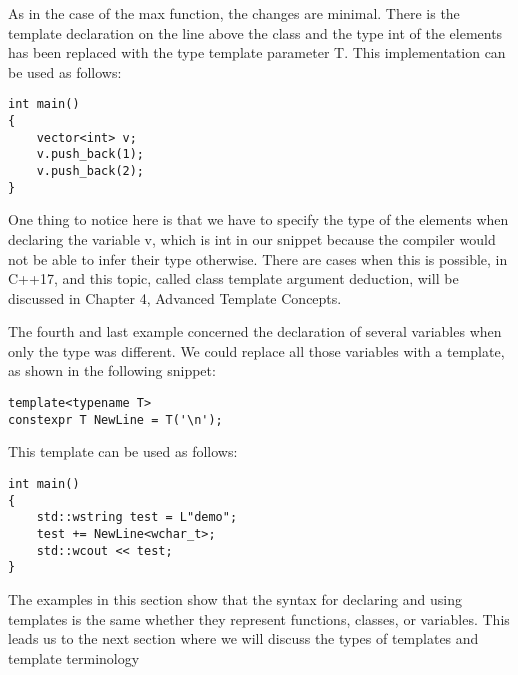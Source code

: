 As in the case of the max function, the changes are minimal. There is the template declaration on the line above the class and the type int of the elements has been replaced with the type template parameter T. This implementation can be used as follows:

\begin{lstlisting}[style=styleCXX]
int main()
{
	vector<int> v;
	v.push_back(1);
	v.push_back(2);
}
\end{lstlisting}

One thing to notice here is that we have to specify the type of the elements when declaring the variable v, which is int in our snippet because the compiler would not be able to infer their type otherwise. There are cases when this is possible, in C++17, and this topic, called class template argument deduction, will be discussed in Chapter 4, Advanced Template Concepts.

The fourth and last example concerned the declaration of several variables when only the type was different. We could replace all those variables with a template, as shown in the following snippet:

\begin{lstlisting}[style=styleCXX]
template<typename T>
constexpr T NewLine = T('\n');
\end{lstlisting}

This template can be used as follows:

\begin{lstlisting}[style=styleCXX]
int main()
{
	std::wstring test = L"demo";
	test += NewLine<wchar_t>;
	std::wcout << test;
}
\end{lstlisting}

The examples in this section show that the syntax for declaring and using templates is the same whether they represent functions, classes, or variables. This leads us to the next section where we will discuss the types of templates and template terminology














